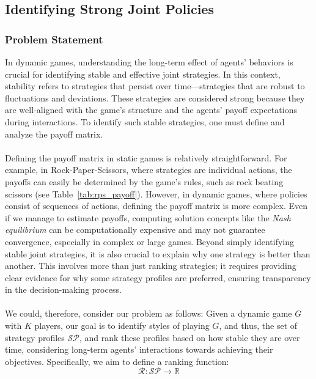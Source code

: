\subsection{Identifying Strong Joint Policies}

\begin{flushleft}


    \subsubsection{Problem Statement}

    \begin{flushleft}

        In dynamic games, understanding the long-term effect of agents' behaviors is crucial for identifying stable and effective joint strategies. In this context, stability refers to strategies that persist over time—strategies that are robust to fluctuations and deviations. These strategies are considered strong because they are well-aligned with the game’s structure and the agents' payoff expectations during interactions. To identify such stable strategies, one must define and analyze the payoff matrix.\\~\\
        
        Defining the payoff matrix in static games is relatively straightforward. For example, in Rock-Paper-Scissors, where strategies are individual actions, the payoffs can easily be determined by the game’s rules, such as rock beating scissors (see Table~\ref{tab:rps_payoff}). However, in dynamic games, where policies consist of sequences of actions, defining the payoff matrix is more complex. Even if we manage to estimate payoffs, computing solution concepts like the \emph{Nash equilibrium} can be computationally expensive and may not guarantee convergence, especially in complex or large games. Beyond simply identifying stable joint strategies, it is also crucial to explain why one strategy is better than another. This involves more than just ranking strategies; it requires providing clear evidence for why some strategy profiles are preferred, ensuring transparency in the decision-making process.\\~\\

        We could, therefore, consider our problem as follows: Given a dynamic game $G$ with $K$ players, our goal is to identify styles of playing $G$, and thus, the set of strategy profiles $\mathcal{SP}$, and rank these profiles based on how stable they are over time, considering long-term agents' interactions towards achieving their objectives. Specifically, we aim to define a ranking function:
        \begin{equation}
            \mathcal{R}: \mathcal{SP} \to \mathbb{R}
            \label{eq:ranking_function}
        \end{equation}
        

\end{flushleft}
\end{flushleft}
